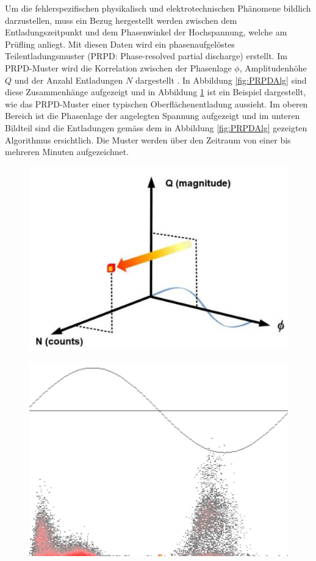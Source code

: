 \begin{refsection}
Um die fehlerspezifischen physikalisch und elektrotechnischen Phänomene bildlich darzustellen, muss ein Bezug hergestellt werden zwischen dem Entladungszeitpunkt und dem Phasenwinkel der Hochspannung, welche am Prüfling anliegt. 
Mit diesen Daten wird ein phasenaufgelöstes Teilentladungsmuster (PRPD: Phase-resolved partial discharge) erstellt. 
Im PRPD-Muster wird die Korrelation zwischen der Phasenlage $\phi$, Amplitudenhöhe $Q$ und der Anzahl Entladungen $N$ dargestellt \cite{buch:UHFSignale}. 
In Abbildung \ref{fig:PRPDAlg} sind diese Zusammenhänge aufgezeigt und in Abbildung \ref{fig:PRPDHohl} 
ist ein Beispiel dargestellt, wie das PRPD-Muster einer typischen Oberflächenentladung aussieht. 
Im oberen Bereich ist die Phasenlage der angelegten Spannung aufgezeigt und im unteren Bildteil sind die Entladungen gemäss dem in Abbildung \ref{fig:PRPDAlg} gezeigten Algorithmus ersichtlich.
Die Muster werden über den Zeitraum von einer bis mehreren Minuten aufgezeichnet.
\begin{figure}
	\centering
	\begin{minipage}{.5\textwidth}
		\centering
		\includegraphics[width=.9\linewidth]{papers/gis/Bilder/PERP}
		\label{fig:PRPDAlg}
	\end{minipage}%
	\begin{minipage}{.5\textwidth}
		\centering
		\includegraphics[width=.8\linewidth]{papers/gis/Bilder/OberflaechenentladungPRPD}
		\label{fig:PRPDHohl}
	\end{minipage}
\end{figure}



\end{refsection}
